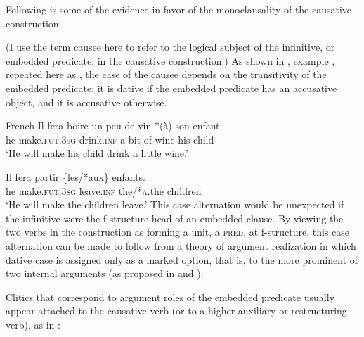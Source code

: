 \documentclass[output=paper,hidelinks]{langscibook}
\begin{document}
\hspace*{-4.8pt}Following is some of the evidence in favor of the monoclausality of the causative construction:

 (I use the term causee here to refer to the logical subject of the infinitive, or embedded predicate, in the causative construction.) As shown in , example , repeated here as , the case of the causee depends on the transitivity of the embedded predicate: it is dative if the embedded predicate has an accusative object, and it is accusative otherwise.
\largerpage

\ea\label{ex:Romance:51} French \citep[153]{Grimshaw90}
\ea\label{ex:Romance:51a}
\gll Il fera boire un peu de vin *(à) son enfant.\\
       he make.\textsc{fut.3sg} drink.\textsc{inf} a bit of wine  his child\\
\glt   `He will make his child drink a little wine.'
\clearpage

\ex\label{ex:Romance:51b}
\gll  Il fera partir \{les/*aux\} enfants.\\
he make.\textsc{fut.3sg} leave.\textsc{inf} the/*\textsc{a}.the children\\
\glt   `He will make the children leave.'
\z\z
This case alternation would be unexpected if the infinitive were the f-structure head of an embedded clause. By viewing the two verbs in the construction as forming a unit, a \textsc{pred}, at f-structure, this case alternation can be made to follow from a theory of argument realization in which dative case is assigned only as a marked option, that is, to the more prominent of two internal arguments (as proposed in \citealt{alsina1996the-role} and \citealt{AlsinaYang2018}).

 Clitics that correspond to argument roles of the embedded predicate usually appear attached to the causative verb (or to a higher auxiliary or restructuring verb), as in :
\end{document}
